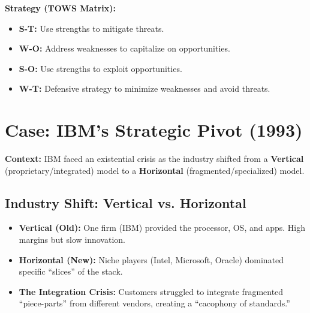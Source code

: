 \textbf{Strategy (TOWS Matrix):}
\begin{itemize}
    \item \textbf{S-T:} Use strengths to mitigate threats.
    \item \textbf{W-O:} Address weaknesses to capitalize on opportunities.
    \item \textbf{S-O:} Use strengths to exploit opportunities.
    \item \textbf{W-T:} Defensive strategy to minimize weaknesses and avoid threats.
\end{itemize}

\section{Case: IBM's Strategic Pivot (1993)}
\textbf{Context:} IBM faced an existential crisis as the industry shifted from a \textbf{Vertical} (proprietary/integrated) model to a \textbf{Horizontal} (fragmented/specialized) model.

\subsection{Industry Shift: Vertical vs. Horizontal}
\begin{itemize}
    \item \textbf{Vertical (Old):} One firm (IBM) provided the processor, OS, and apps. High
          margins but slow innovation.
    \item \textbf{Horizontal (New):} Niche players (Intel, Microsoft, Oracle) dominated specific
          ``slices'' of the stack.
    \item \textbf{The Integration Crisis:} Customers struggled to integrate fragmented
          ``piece-parts'' from different vendors, creating a ``cacophony of standards.''
\end{itemize}

